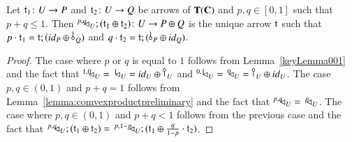 \begin{corollary}\label{cor:finaleTC}
    Let $\mathfrak{t}_1\colon U\to P$ and $\mathfrak{t}_2\colon U \to Q$ be arrows of $\mathbf{T}(\mathbf{C})$ and $p,q\in [0,1]$ such that $p+q\le 1$. Then $^{p,q}\!\! \lhd_{U};(\mathfrak{t}_1 \oplus \mathfrak{t}_2) \colon U \to P\oplus Q$ is the unique arrow $\mathfrak{t}$ such that  $p\cdot \t_1 = \t; (\id{P} \oplus \bang{Q})$ and $q\cdot \t_2 = \t; (\bang{P} \oplus \id{Q})$.
\end{corollary}
\begin{proof}
    The case where $p$ or $q$ is equal to $1$ follows from Lemma~\ref{keyLemma001} and the fact that $\diaggen{1,0}{U} =\, \diaggen{1}{U}= \id{U}\oplus \cobang{U}$ and $\diaggen{0,1}{U} =\, \diaggen{0}{U} = \cobang{U}\oplus \id{U}$. The case $p,q\in (0,1)$ and $p+q=1$ follows from Lemma~\ref{lemma:comvexproductpreliminary} and the fact that $^{p,q}\!\! \lhd_{U} =\, ^p\!\! \lhd_{U}$. The case where $p,q\in (0,1)$ and $p+q<1$ follows from the previous case and the fact that $^{p,q}\!\! \lhd_{U};(\mathfrak{t}_1\oplus \mathfrak{t}_2) =\, ^{p,1-p}\!\! \lhd_{U}; (\mathfrak{t}_1 \oplus \frac{q}{1-p}\cdot \mathfrak{t}_2)$.
\end{proof}



